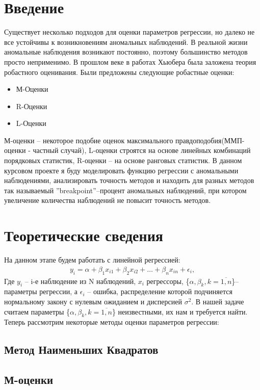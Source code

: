 \documentclass[12pt]{article}
\begin{document}
\section{Введение}
Существует несколько подходов для оценки параметров регрессии, но далеко не все устойчивы к возникновениям аномальных наблюдений.
В реальной жизни аномальные наблюдения возникают постоянно, поэтому большинство методов просто неприменимо.
В прошлом веке в работах Хьюбера была заложена теория робастного оценивания.\hfill\break
Были предложены следующие робастные оценки\cite{Huber}:\hfill\break
\begin{itemize}
    \item М-Оценки\\
    \item R-Оценки\\
    \item L-Оценки
\end{itemize}
М-оценки -- некоторое подобие оценок максимального правдоподобия(ММП-оценки - частный случай), L-оценки строятся на основе линейных комбинаций порядковых статистик, R-оценки -- на основе ранговых статистик.
В данном курсовом проекте я буду моделировать функцию регрессии с аномальными наблюдениями, анализировать точность методов и находить для разных методов так называемый ''breakpoint''--процент аномальных наблюдений, при котором увеличение количества наблюдений не повысит точность методов.


\section{Теоретические сведения}
На данном этапе будем работать с линейной регрессией:\hfill\break
\begin{eqnarray}
    y_i=\alpha+\beta_1 x_{i1}+\beta_2 x_{i2}+\dots+\beta_n x_{in}+\epsilon_i,
\end{eqnarray}
Где $y_i$ -- i-е наблюдение из N наблюдений, $x_i$ регрессоры, \{$\alpha,\beta_k, k=\overline{1,n}$\}-- параметры регрессии, а $\epsilon_i$ -- ошибка, распределение которой подчиняется нормальному закону с нулевым ожиданием и дисперсией $\sigma^2$.\hfill\break
В нашей задаче считаем параметры \{$\alpha,\beta_k, k=\overline{1,n}$\} неизвестными, их нам и требуется найти.\hfill\break
Теперь рассмотрим некоторые методы оценки параметров регрессии:
\subsection{Метод Наименьших Квадратов}
\subsection{М-оценки}
\end{document}
